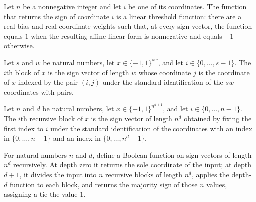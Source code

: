 \begin{theorem}
\label{FABL.dictator_isLinearThreshold}
\leanok
{}
Let $n$ be a nonnegative integer and let $i$ be one of its coordinates. The function
that returns the sign of coordinate $i$ is a linear threshold function: there are a real
bias and real coordinate weights such that, at every sign vector, the function equals
$1$ when the resulting affine linear form is nonnegative and equals $-1$ otherwise.
\end{theorem}

\begin{definition}
\label{FABL.inputBlock}
\leanok
Let $s$ and $w$ be natural numbers, let $x\in\{-1,1\}^{sw}$, and let
$i\in\{0,\ldots,s-1\}$. The $i$th block of $x$ is the sign vector of length $w$ whose
coordinate $j$ is the coordinate of $x$ indexed by the pair $(i,j)$ under the standard
identification of the $sw$ coordinates with pairs.
\end{definition}

\begin{definition}
\label{FABL.recursiveInputBlock}
\leanok
Let $n$ and $d$ be natural numbers, let $x\in\{-1,1\}^{n^{d+1}}$, and let
$i\in\{0,\ldots,n-1\}$. The $i$th recursive block of $x$ is the sign vector of length
$n^d$ obtained by fixing the first index to $i$ under the standard identification of the
coordinates with an index in $\{0,\ldots,n-1\}$ and an index in $\{0,\ldots,n^d-1\}$.
\end{definition}

\begin{definition}
\label{FABL.recursiveMajority}
\leanok
{}
For natural numbers $n$ and $d$, define a Boolean function on sign vectors of length
$n^d$ recursively. At depth zero it returns the sole coordinate of the input; at depth
$d+1$, it divides the input into $n$ recursive blocks of length $n^d$, applies the
depth-$d$ function to each block, and returns the majority sign of those $n$ values,
assigning a tie the value $1$.
\end{definition}

